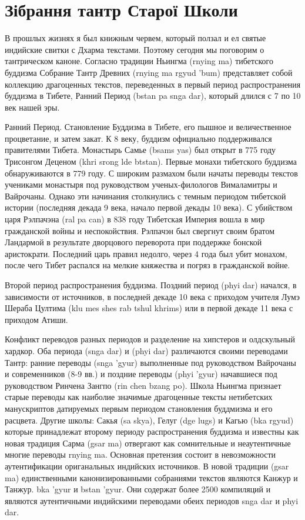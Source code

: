 \section{Зібрання тантр Старої Школи}
 
В прошлых жизнях я был книжным червем, который ползал и ел святые индийские свитки с Дхарма текстами. Поэтому сегодня мы поговорим о тантрическом каноне. Согласно традиции Ньингма (rnying ma) тибетского буддизма Собрание Тантр Древних (rnying ma rgyud 'bum) представляет собой коллекцию драгоценных текстов, переведенных в первый период распространения буддизма в Тибете, Ранний Период (bstan pa snga dar), который длился с 7 по 10 век нашей эры.

Ранний Период. Становление Буддизма в Тибете, его пышное и величественное процветание, и затем закат. К 8 веку, буддизм официально поддерживался правителями Тибета. Монастырь Самье (bsams yas) был открыт в 775 году Трисонгом Деценом (khri srong lde btstan). Первые монахи тибетского буддизма обнаруживаются в 779 году. С широким размахом были начаты переводы текстов учениками монастыря под руководством ученых-филологов Вималамитры и Вайрочаны. Однако эти начинания столкнулись с темным периодом тибетской истории (последняя декада 9 века, начало первой декады 10 века). С убийством царя Рэлпачэна (ral pa can) в 838 году Тибетская Империя вошла в мир гражданской войны и неспокойствия. Рэлпачэн был свергнут своим братом Ландармой в результате дворцового переворота при поддержке бонской аристократи. Последний царь правил недолго, через 4 года был убит монахом, после чего Тибет распался на мелкие княжества и погряз в гражданской войне.

Второй период распространения буддизма. Поздний период (phyi dar) начался, в зависимости от источников, в последней декаде 10 века с приходом учителя Лумэ Шераба Цултима (klu mes shes rab tshul khrims) или в первой декаде 11 века с приходом Атиши.

Конфликт переводов разных периодов и разделение на хипстеров и олдскульный хардкор. Оба периода (snga dar) и (phyi dar) различаются своими переводами Тантр: ранние переводы (snga 'gyur) выполненные под руководством Вайрочаны и современников (8-9 вв.) и поздние переводы (phyi 'gyur) начавшиеся под руководством Ринчена Зангпо (rin chen bzang po). Школа Ньингма признает старые переводы как наиболие значимые драгоценные тексты нетибетских манускриптов датируемых первым периодом становления буддмизма и его расцвета. Другие школы: Сакья (sa skya), Гелуг (dge lugs) и Кагью (bka rgyud) которые принадлежат второму периоду распространения буддизма и известны как новая традиция Сарма (gsar ma) отвергают как сомнительные и неаутентичные многие переводы rnying ma. Основная претензия состоит в невозможности аутентификации ориганальных индийских источников. В новой традиции (gsar ma) единственными канонизированными собраниями текстов являются Канжур и Танжур. bka 'gyur и bstan 'gyur. Они содержат более 2500 компиляций и являются аутентичными индийскими переводами обеих периодов snga dar и phyi dar.

